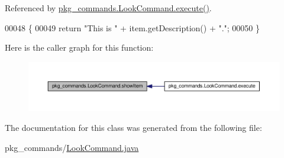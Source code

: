Referenced by \hyperlink{LookCommand_8java_source_l00026}{pkg\-\_\-commands.\-Look\-Command.\-execute()}.


\begin{DoxyCode}
00048                                        \{
00049         \textcolor{keywordflow}{return} \textcolor{stringliteral}{"This is "} + item.getDescription() + \textcolor{stringliteral}{"."};
00050     \}
\end{DoxyCode}


Here is the caller graph for this function\-:
\nopagebreak
\begin{figure}[H]
\begin{center}
\leavevmode
\includegraphics[width=350pt]{classpkg__commands_1_1LookCommand_a17808882dffb0a9edce192235c029ddf_icgraph}
\end{center}
\end{figure}




The documentation for this class was generated from the following file\-:\begin{DoxyCompactItemize}
\item 
pkg\-\_\-commands/\hyperlink{LookCommand_8java}{Look\-Command.\-java}\end{DoxyCompactItemize}
